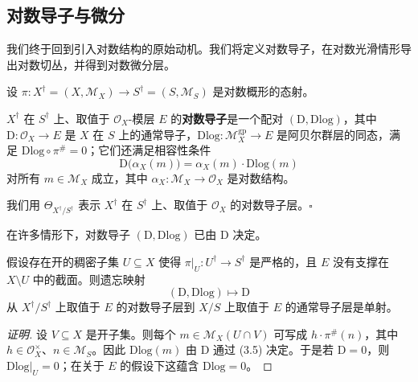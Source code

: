 \subsection{对数导子与微分}

我们终于回到引入对数结构的原始动机。我们将定义对数导子，在对数光滑情形导出对数切丛，并得到对数微分层。

设 $\pi:X^{\dagger}=(X,\mathcal{M}_X)\to S^{\dagger}=(S,\mathcal{M}_S)$ 是对数概形的态射。

\begin{definition}
$X^{\dagger}$ 在 $S^{\dagger}$ 上、取值于 $\mathcal{O}_X$-模层 $E$ 的\textbf{对数导子}是一个配对 $(\mathrm{D},\mathrm{Dlog})$，其中 $\mathrm{D}:\mathcal{O}_X\to E$ 是 $X$ 在 $S$ 上的通常导子，$\mathrm{Dlog}:\mathcal{M}_X^{\mathrm{gp}}\to E$ 是阿贝尔群层的同态，满足 $\mathrm{Dlog}\circ\pi^{\#}=0$；它们还满足相容性条件
\begin{equation}
  \mathrm{D}\bigl(\alpha_X(m)\bigr)=\alpha_X(m)\cdot\mathrm{Dlog}(m)
  \tag{3.5}
\end{equation}
对所有 $m\in\mathcal{M}_X$ 成立，其中 $\alpha_X:\mathcal{M}_X\to\mathcal{O}_X$ 是对数结构。

我们用 $\Theta_{X^{\dagger}/S^{\dagger}}$ 表示 $X^{\dagger}$ 在 $S^{\dagger}$ 上、取值于 $\mathcal{O}_X$ 的对数导子层。\hfill$\square$
\end{definition}

在许多情形下，对数导子 $(\mathrm{D},\mathrm{Dlog})$ 已由 $\mathrm{D}$ 决定。

\begin{proposition}
假设存在开的稠密子集 $U\subseteq X$ 使得 $\pi|_U:U^{\dagger}\to S^{\dagger}$ 是严格的，且 $E$ 没有支撑在 $X\setminus U$ 中的截面。则遗忘映射
\[
  (\mathrm{D},\mathrm{Dlog})\longmapsto\mathrm{D}
\]
从 $X^{\dagger}/S^{\dagger}$ 上取值于 $E$ 的对数导子层到 $X/S$ 上取值于 $E$ 的通常导子层是单射。
\end{proposition}

\begin{proof}[证明]
设 $V\subseteq X$ 是开子集。则每个 $m\in\mathcal{M}_X(U\cap V)$ 可写成 $h\cdot\pi^{\#}(n)$，其中 $h\in\mathcal{O}_X^{\times}$、$n\in\mathcal{M}_S$。因此 $\mathrm{Dlog}(m)$ 由 $\mathrm{D}$ 通过 (3.5) 决定。于是若 $\mathrm{D}=0$，则 $\mathrm{Dlog}|_U=0$；在关于 $E$ 的假设下这蕴含 $\mathrm{Dlog}=0$。
\end{proof}


